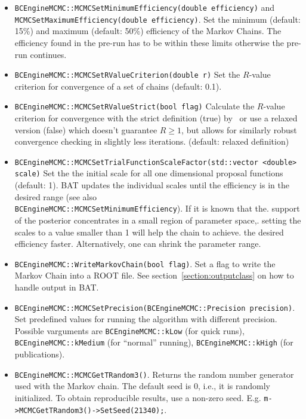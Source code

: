 \documentclass[11pt, a4paper]{article}
\begin{document}
\begin{itemize}
\item \verb|BCEngineMCMC::MCMCSetMinimumEfficiency(double efficiency)| and \\
  \verb|MCMCSetMaximumEfficiency(double efficiency)|. Set the minimum
  (default: 15\%) and maximum (default: 50\%) efficiency of the Markov
  Chains. The efficiency found in the pre-run has to be within these
  limits otherwise the pre-run continues.

\item \verb|BCEngineMCMC::MCMCSetRValueCriterion(double r)| Set the
  $R$-value criterion for convergence of a set of chains (default:
  0.1).

\item \verb|BCEngineMCMC::MCMCSetRValueStrict(bool flag)| Calculate the
  $R$-value criterion for convergence with the strict definition (true)
  by~\cite{R_value}  or use a relaxed version (false) which doesn't guarantee
  $R \ge 1$, but allows for similarly robust convergence checking in slightly
  less iterations. (default: relaxed definition)

\item \verb|BCEngineMCMC::MCMCSetTrialFunctionScaleFactor(std::vector <double> scale)|
  Set the the initial scale for all one dimensional proposal functions (default: 1).
  BAT updates the individual scales until the efficiency is in the desired range
  (see also \\ \verb|BCEngineMCMC::MCMCSetMinimumEfficiency|). If it is known that the.
  support of the posterior concentrates in a small region of parameter space,.
  setting the scales to a value smaller than 1 will help the chain to achieve.
  the desired efficiency faster. Alternatively, one can shrink the parameter range.

\item \verb|BCEngineMCMC::WriteMarkovChain(bool flag)|. Set a flag to
 write the Markov Chain into a ROOT file. See
 section~\ref{section:outputclass} on how to handle output in BAT.

\item
  \verb|BCEngineMCMC::MCMCSetPrecision(BCEngineMCMC::Precision precision)|. Set
  predefined values for running the algorithm with different
  precision. Possible varguments are \linebreak \verb|BCEngineMCMC::kLow| (for
  quick runs), \verb|BCEngineMCMC::kMedium| (for ``normal'' running),
  \linebreak \verb|BCEngineMCMC::kHigh| (for publications).

\item \verb|BCEngineMCMC::MCMCGetTRandom3()|. Returns the random number
generator used with the Markov chain. The default seed is 0, i.e.,
it is randomly initialized. To obtain reproducible results, use
a non-zero seed. E.g.
\verb|m->MCMCGetTRandom3()->SetSeed(21340);|.
\end{itemize}
\end{document}
